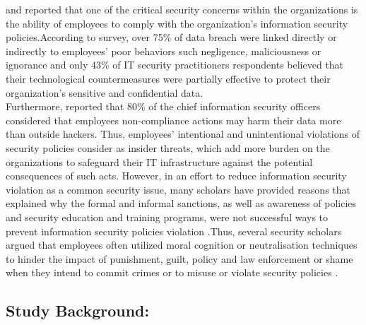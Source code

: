 \cite{Siponen2010} and \cite{Puhakainen2010} reported that one of the critical security concerns within the organizations is the ability of employees to comply with the organization's information security policies.According to \citet{PonemonInstitute2012} survey, over 75\% of data breach were linked directly or indirectly to employees' poor behaviors such negligence, maliciousness or ignorance and only 43\% of IT security practitioners respondents believed that their technological countermeasures were partially effective to protect their organization's sensitive and confidential data. \\
Furthermore,\cite{Barlow2013} reported that 80\% of the chief information security officers considered that employees non-compliance actions may harm their data more than outside hackers. Thus, employees' intentional and unintentional violations of security policies consider as insider threats, which add more burden on the organizations to safeguard their IT infrastructure against the potential consequences of such acts. However, in an effort to reduce information security violation as a common security issue, many scholars have provided reasons that explained why the formal and informal sanctions, as well as awareness of policies and security education and training programs, were not successful ways to prevent information security policies violation   \cite{Siponen2010,Darcy,Chen2012,}.Thus, several security scholars argued that employees often utilized moral cognition or neutralisation techniques to hinder the impact of punishment, guilt, policy and law enforcement or shame when they intend to commit crimes or to misuse or violate security policies \cite{Siponen2010,Barlow2013,Teh2015,Sykes1957,Kim2014,Hinduja2007,Ingram2008}.\\

\subsection{Study Background:}

